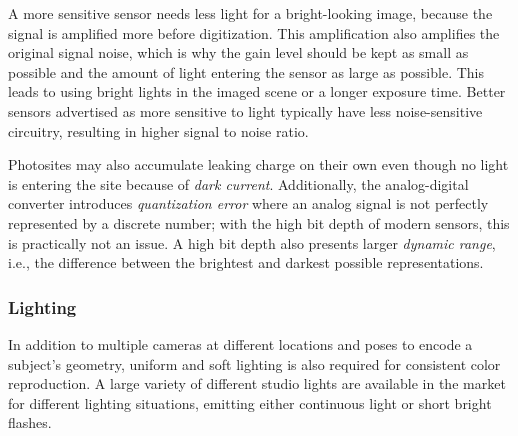 A more sensitive sensor needs less light for a bright-looking image, because the signal is amplified more before digitization.
This amplification also amplifies the original signal noise, which is why the gain level should be kept as small as possible and the amount of light entering the sensor as large as possible.
This leads to using bright lights in the imaged scene or a longer exposure time.
Better sensors advertised as more sensitive to light typically have less noise-sensitive circuitry, resulting in higher signal to noise ratio.
\cite{el2005cmos}

Photosites may also accumulate leaking charge on their own even though no light is entering the site because of \emph{dark current}.
Additionally, the analog-digital converter introduces \emph{quantization error} where an analog signal is not perfectly represented by a discrete number; with the high bit depth of modern sensors, this is practically not an issue.
A high bit depth also presents larger \emph{dynamic range}, i.e., the difference between the brightest and darkest possible representations.
\cite{el2005cmos,litwiller2001ccd}



\subsubsection{Lighting} \label{sec:bg-lighting} %

In addition to multiple cameras at different locations and poses to encode a subject's geometry, uniform and soft lighting is also required for consistent color reproduction.
A large variety of different studio lights are available in the market for different lighting situations, emitting either continuous light or short bright flashes.


